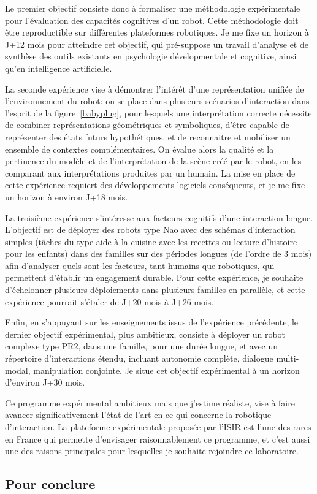 \documentclass[a4paper]{article}
\begin{document}
Le premier objectif consiste donc à formaliser une méthodologie expérimentale
pour l'évaluation des capacités cognitives d'un robot. Cette méthodologie doit
être reproductible sur différentes plateformes robotiques. Je me fixe un horizon
à J+12 mois pour atteindre cet objectif, qui pré-suppose un travail d'analyse et de
synthèse des outils existants en psychologie dévelopmentale et cognitive, ainsi
qu'en intelligence artificielle.

La seconde expérience vise à démontrer l'intérêt d'une représentation unifiée de
l'environnement du robot: on se place dans plusieurs scénarios d'interaction
dans l'esprit de la figure~\ref{babyplug}, pour lesquels une interprétation
correcte nécessite de combiner représentations géométriques et symboliques,
d'être capable de représenter des états futurs hypothétiques, et de reconnaitre
et mobiliser un ensemble de contextes complémentaires. On évalue alors la
qualité et la pertinence du modèle et de l'interprétation de la scène créé par
le robot, en les comparant aux interprétations produites par un humain. La mise
en place de cette expérience requiert des développements logiciels conséquents,
et je me fixe un horizon à environ J+18 mois.

La troisième expérience s'intéresse aux facteurs cognitifs d'une interaction
longue. L'objectif est de déployer des robots type Nao avec des schémas
d'interaction simples (tâches du type aide à la cuisine avec les recettes ou
lecture d'histoire pour les enfants) dans des familles sur des périodes longues
(de l'ordre de 3 mois) afin d'analyser quels sont les facteurs, tant humains que
robotiques, qui permettent d'établir un engagement durable. Pour cette
expérience, je souhaite d'échelonner plusieurs déploiements dans plusieurs
familles en parallèle, et cette expérience pourrait s'étaler de J+20 mois à J+26
mois.

Enfin, en s'appuyant sur les enseignements issus de l'expérience précédente, le
dernier objectif expérimental, plus ambitieux, consiste à déployer un robot
complexe type PR2, dans une famille, pour une durée longue, et avec un
répertoire d'interactions étendu, incluant autonomie complète, dialogue
multi-modal, manipulation conjointe. Je situe cet objectif expérimental à un
horizon d'environ J+30 mois.

Ce programme expérimental ambitieux mais que j'estime réaliste, vise à faire
avancer significativement l'état de l'art en ce qui concerne la robotique
d'interaction. La plateforme expérimentale proposée par l'ISIR est l'une des rares
en France qui permette d'envisager raisonnablement ce programme, et c'est aussi
une des raisons principales pour lesquelles je souhaite rejoindre ce
laboratoire.

\subsection{Pour conclure}

\printbibliography
\end{document}
